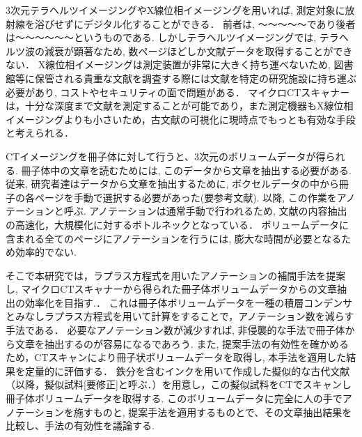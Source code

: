3次元テラヘルツイメージングやX線位相イメージングを用いれば, 測定対象に放射線を浴びせずにデジタル化することができる．
前者は, 〜〜〜〜〜であり後者は〜〜〜〜〜〜というものである. %
しかしテラヘルツイメージングでは, テラヘルツ波の減衰が顕著なため, 数ページほどしか文献データを取得することができない．
X線位相イメージングは測定装置が非常に大きく持ち運べないため, 図書館等に保管される貴重な文献を調査する際には文献を特定の研究施設に持ち運ぶ必要があり, コストやセキュリティの面で問題がある．
マイクロCTスキャナーは，十分な深度まで文献を測定することが可能であり，また測定機器もX線位相イメージングよりも小さいため，古文献の可視化に現時点でもっとも有効な手段と考えられる．

CTイメージングを冊子体に対して行うと、3次元のボリュームデータが得られる.
冊子体中の文章を読むためには, このデータから文章を抽出する必要がある.
従来, 研究者達はデータから文章を抽出するために, ボクセルデータの中から冊子の各ページを手動で選択する必要があった(要参考文献).
以降, この作業をアノテーションと呼ぶ.
アノテーションは通常手動で行われるため, 文献の内容抽出の高速化，大規模化に対するボトルネックとなっている．
ボリュームデータに含まれる全てのページにアノテーションを行うには, 膨大な時間が必要となるため効率的でない.

そこで本研究では，ラプラス方程式を用いたアノテーションの補間手法を提案し, マイクロCTスキャナーから得られた冊子体ボリュームデータからの文章抽出の効率化を目指す.．
これは冊子体ボリュームデータを一種の積層コンデンサとみなしラプラス方程式を用いて計算をすることで，アノテーション数を減らす手法である．
必要なアノテーション数が減少すれば, 非侵襲的な手法で冊子体から文章を抽出するのが容易になるであろう.
また, 提案手法の有効性を確かめるため，CTスキャンにより冊子状ボリュームデータを取得し, 本手法を適用した結果を定量的に評価する．
鉄分を含むインクを用いて作成した擬似的な古代文献（以降，擬似試料[要修正]と呼ぶ．）を用意し，この擬似試料をCTでスキャンし冊子体ボリュームデータを取得する.
このボリュームデータに完全に人の手でアノテーションを施すものと, 提案手法を適用するものとで、その文章抽出結果を比較し、手法の有効性を議論する.




